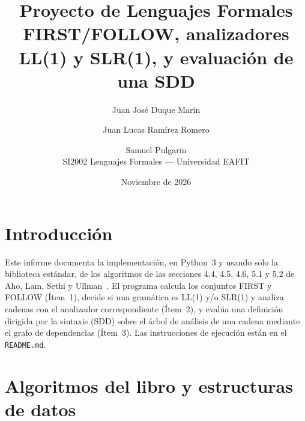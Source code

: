 \documentclass[11pt,a4paper]{article}
\title{Proyecto de Lenguajes Formales\\[2pt]
\large FIRST/FOLLOW, analizadores LL(1) y SLR(1), y evaluación de una SDD}
\author{Juan José Duque Marín \and Juan Lucas Ramírez Romero \and Samuel Pulgarin\\[4pt]
\small SI2002 Lenguajes Formales --- Universidad EAFIT}
\date{Noviembre de 2026}
\newcommand{\code}[1]{\texttt{#1}}
\begin{document}
\maketitle
\tableofcontents

\section{Introducción}
Este informe documenta la implementación, en Python~3 y usando solo la biblioteca estándar, de
los algoritmos de las secciones 4.4, 4.5, 4.6, 5.1 y 5.2 de Aho, Lam, Sethi y Ullman~\cite{aho}.
El programa calcula los conjuntos FIRST y FOLLOW (Ítem~1), decide si una gramática es LL(1) y/o
SLR(1) y analiza cadenas con el analizador correspondiente (Ítem~2), y evalúa una definición
dirigida por la sintaxis (SDD) sobre el árbol de análisis de una cadena mediante el grafo de
dependencias (Ítem~3). Las instrucciones de ejecución están en el \code{README.md}.

\section{Algoritmos del libro y estructuras de datos}
\end{document}
